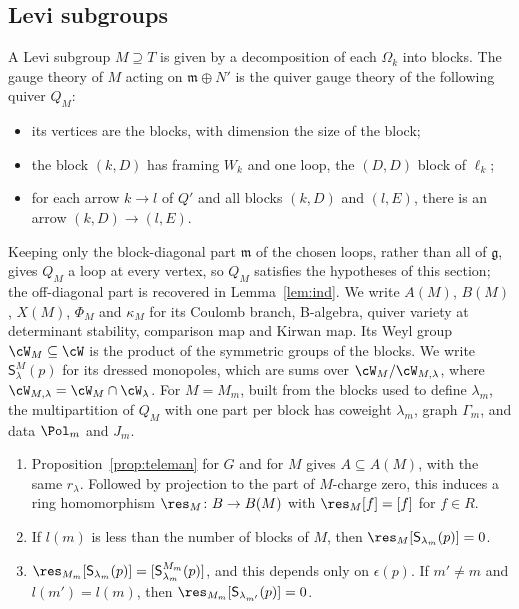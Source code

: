 \documentclass[11pt]{amsart}
\begin{document}
\subsection{Levi subgroups}\label{ss:levi}
A Levi subgroup $M\supseteq T$ is given by a decomposition of each
$\Omega_k$ into blocks.  The gauge theory of $M$ acting on $\mathfrak
m\oplus N'$ is the quiver gauge theory of the following quiver $Q_M$:
\begin{itemize}[leftmargin=2em]
\item its vertices are the blocks, with dimension the size of the block;
\item the block $(k,D)$ has framing $W_k$ and one loop, the $(D,D)$ block of
$\ell_k$;
\item for each arrow $k\to l$ of $Q'$ and all blocks $(k,D)$ and $(l,E)$,
there is an arrow $(k,D)\to(l,E)$.
\end{itemize}
Keeping only the block-diagonal part $\mathfrak m$ of the chosen loops, rather
than all of $\mathfrak g$, gives $Q_M$ a loop at every vertex, so $Q_M$
satisfies the hypotheses of this section; the off-diagonal part is recovered
in Lemma~\ref{lem:ind}.  We write $A(M)$,
$B(M)$, $X(M)$, $\Phi_M$ and $\kappa_M$ for its Coulomb branch, B-algebra,
quiver variety at determinant stability, comparison map and Kirwan map.
Its Weyl group $\cW_M\subseteq\cW$ is the product of the symmetric groups
of the blocks.  We write $\mathsf S^M_\lambda(p)$ for its dressed monopoles,
which are sums over $\cW_M/\cW_{M,\lambda}$, where
$\cW_{M,\lambda}=\cW_M\cap\cW_\lambda$.  For $M=M_m$, built from the blocks used to
define $\lambda_m$, the multipartition of $Q_M$ with one part per block has
coweight $\lambda_m$, graph $\Gamma_m$, and data $\Pol_m$ and $J_m$.

\begin{lemma}[restriction]\label{lem:restr}
\begin{enumerate}[leftmargin=2em]
\item Proposition~\ref{prop:teleman} for $G$ and for $M$ gives $A\subseteq
A(M)$, with the same $r_\lambda$.  Followed by projection to the part of
$M$-charge zero, this induces a ring homomorphism
$\res_M\colon B\to B(M)$ with $\res_M[f]=[f]$ for $f\in R$.
\item If $l(m)$ is less than the number of blocks of $M$, then
$\res_M[\mathsf S_{\lambda_m}(p)]=0$.
\item $\res_{M_m}[\mathsf S_{\lambda_m}(p)]=[\mathsf
S^{M_m}_{\lambda_m}(p)]$, and this depends only on $\epsilon(p)$.  If
$m'\neq m$ and $l(m')=l(m)$, then $\res_{M_m}[\mathsf S_{\lambda_{m'}}(p)]=0$.
\end{enumerate}
\end{lemma}
\end{document}
